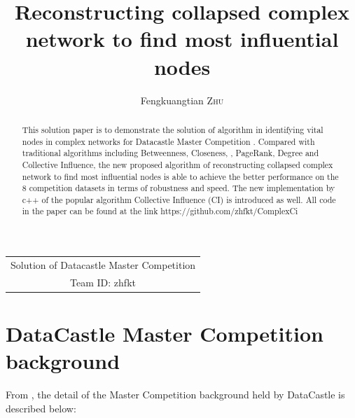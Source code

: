 \documentclass{article}
\title{ Reconstructing collapsed complex network to find most influential nodes  } %
\author{Fengkuangtian \textsc{Zhu}} %
\begin{document}
	
	\maketitle %
	
	
	
	\begin{center}
		\begin{tabular}{c}
			Solution of Datacastle Master Competition	\\
			Team ID: zhfkt 
		\end{tabular}
	\end{center}
	
	\begin{abstract}
		This solution paper is to demonstrate the solution of algorithm in identifying vital nodes in complex networks for Datacastle Master Competition . Compared with traditional algorithms including Betweenness\cite{wikiBetweennesscentrality}, Closeness\cite{wikiClosenesscentrality}, \cite{wikiCentrality}, PageRank\cite{wikiPageRank}, Degree\cite{wikiCentrality} and Collective Influence\cite{morone2015influence}\cite{morone2016collective}, the new proposed algorithm of reconstructing collapsed complex network to find most influential nodes is able to achieve the better performance on the 8 competition datasets in terms of robustness\cite{schneider2011mitigation} and speed. The new implementation by c++ of the popular algorithm Collective Influence (CI) is introduced as well. All code in the paper can be found at the link https://github.com/zhfkt/ComplexCi \cite{zhfktgithub} \cite{zhfkt2017887989}
	\end{abstract}
	
	
	\section{DataCastle Master Competition background}
	
	From \cite{masterCompetitionbackground} , the detail of the Master Competition background held by DataCastle is described below:
	
\end{document}
